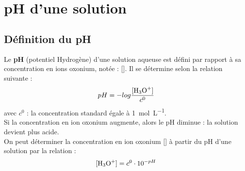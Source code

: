 \documentclass[a4paper,11pt,fleqn]{scrartcl}%
\begin{document}
\section{pH d'une solution}
	\subsection{Définition du pH}
Le \textbf{pH} (potentiel Hydrogène) d'une solution aqueuse est défini par rapport à sa concentration en ions oxonium, notée : []. Il se détermine selon la relation suivante :
$$pH = -log \frac{[\ce{H3O+}]}{c^0}$$
avec $c^0$ : la concentration standard égale à \SI{1}{\mole\per\liter}.\\
Si la concentration en ion oxonium augmente, alors le pH diminue : la solution devient plus acide.\\

On peut déterminer la concentration en ion oxonium [] à partir du pH d'une solution par la relation :
$$[\ce{H3O+}] = c^0 \cdot 10^{-pH}$$
\end{document}
